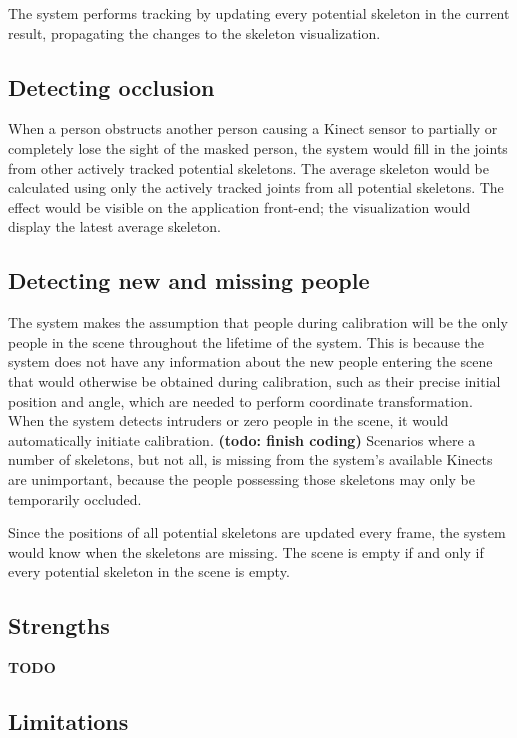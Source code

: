 \documentclass{sigchi}
\begin{document}
The system performs tracking by updating every potential skeleton in the current result, propagating the changes to the skeleton visualization.

\subsection{Detecting occlusion}

When a person obstructs another person causing a Kinect sensor to partially or completely lose the sight of the masked person, the system would fill in the joints from other actively tracked potential skeletons. The average skeleton would be calculated using only the actively tracked joints from all potential skeletons. The effect would be visible on the application front-end; the visualization would display the latest average skeleton.

\subsection{Detecting new and missing people}

The system makes the assumption that people during calibration will be the only people in the scene throughout the lifetime of the system. This is because the system does not have any information about the new people entering the scene that would otherwise be obtained during calibration, such as their precise initial position and angle, which are needed to perform coordinate transformation. When the system detects intruders or zero people in the scene, it would automatically initiate calibration. \textbf{(todo: finish coding)} Scenarios where a number of skeletons, but not all, is missing from the system's available Kinects are unimportant, because the people possessing those skeletons may only be temporarily occluded.

Since the positions of all potential skeletons are updated every frame, the system would know when the skeletons are missing. The scene is empty if and only if every potential skeleton in the scene is empty.

\subsection{Strengths}

\textbf{TODO}

\subsection{Limitations}
\end{document}
